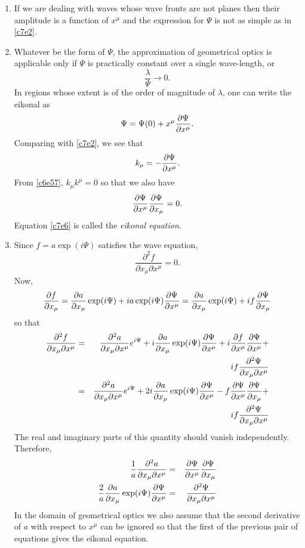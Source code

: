 \begin{enumerate}
\item If we are dealing with waves whose wave fronts are not planes then their
amplitude is a function of $x^\mu$ and the expression for $\Psi$ is not as 
simple as in \eqref{c7e2}.

\item Whatever be the form of $\Psi$, the approximation of geometrical optics
is applicable only if $\Psi$ is practically constant over a single wave-length, 
or
\begin{equation}\label{c7e3}
\frac{\lambda}{\Psi} \rightarrow 0.
\end{equation} 
In regions whose extent is of the order of magnitude of $\lambda$, one can write
the eikonal as 
\begin{equation}\label{c7e4}
\Psi = \Psi(0) + x^\mu\frac{\partial{\Psi}}{\partial{x^\mu}}.
\end{equation}
Comparing with \eqref{c7e2}, we see that
\begin{equation}\label{c7e5}
k_\mu = -\frac{\partial{\Psi}}{\partial{x^\mu}}.
\end{equation}
From \eqref{c6e57}, $k_\mu k^\mu = 0$ so that we also have
\begin{equation}\label{c7e6}
\frac{\partial{\Psi}}{\partial{x^\mu}}\frac{\partial{\Psi}}{\partial{x_\mu}} = 0.
\end{equation}
Equation \eqref{c7e6} is called the \emph{eikonal equation}.

\item Since $f = a\exp(i\Psi)$ satisfies the wave equation, 
\[
\frac{\partial^2 f}{\partial x_\mu \partial x^\mu} = 0.
\]
Now,
\[
\frac{\partial{f}}{\partial{x_\mu}} = \frac{\partial{a}}{\partial{x_\mu}}\exp(i\Psi) + ia\exp(i\Psi)\frac{\partial{\Psi}}{\partial{x^\mu}} =
\frac{\partial{a}}{\partial{x_\mu}}\exp(i\Psi) + if\frac{\partial{\Psi}}{\partial{x_\mu}}
\]
so that
\begin{eqnarray*}
\frac{\partial^2 f}{\partial x_\mu \partial x^\mu} &=& 
    \frac{\partial^2 a}{\partial x_\mu \partial x^\mu}e^{i\Psi} + 
 	i\frac{\partial{a}}{\partial{x_\mu}}\exp(i\Psi)\frac{\partial{\Psi}}{\partial{x^\mu}} + 
	i\frac{\partial{f}}{\partial{x^\mu}}\frac{\partial{\Psi}}{\partial{x^\mu}} + \\
 & & if\frac{\partial^2 \Psi}{\partial x_\mu \partial x^\mu} \\
 &=& \frac{\partial^2 a}{\partial x_\mu \partial x^\mu}e^{i\Psi} + 
    2i\frac{\partial{a}}{\partial{x_\mu}}\exp(i\Psi)\frac{\partial{\Psi}}{\partial{x^\mu}} -
	f\frac{\partial{\Psi}}{\partial{x^\mu}}\frac{\partial{\Psi}}{\partial{x_\mu}} + \\
 & &  if\frac{\partial^2 \Psi}{\partial x_\mu \partial x^\mu}
\end{eqnarray*}
The real and imaginary parts of this quantity should vanish independently. 
Therefore,
\begin{eqnarray}
\frac{1}{a}\frac{\partial^2 a}{\partial x_\mu \partial x^\mu} &=& 
  \frac{\partial{\Psi}}{\partial{x^\mu}}\frac{\partial{\Psi}}{\partial{x_\mu}} \label{c7e7} \\
\frac{2}{a}\frac{\partial{a}}{\partial{x_\mu}}\exp(i\Psi)\frac{\partial{\Psi}}{\partial{x^\mu}} &=& 
\frac{\partial^2 \Psi}{\partial x_\mu \partial x^\mu} \label{c7e8} 
\end{eqnarray}
In the domain of geometrical optics we also assume that the second derivative of
$a$ with respect to $x^\mu$ can be ignored so that the first of the previous pair
of equations gives the eikonal equation.


\end{enumerate}
